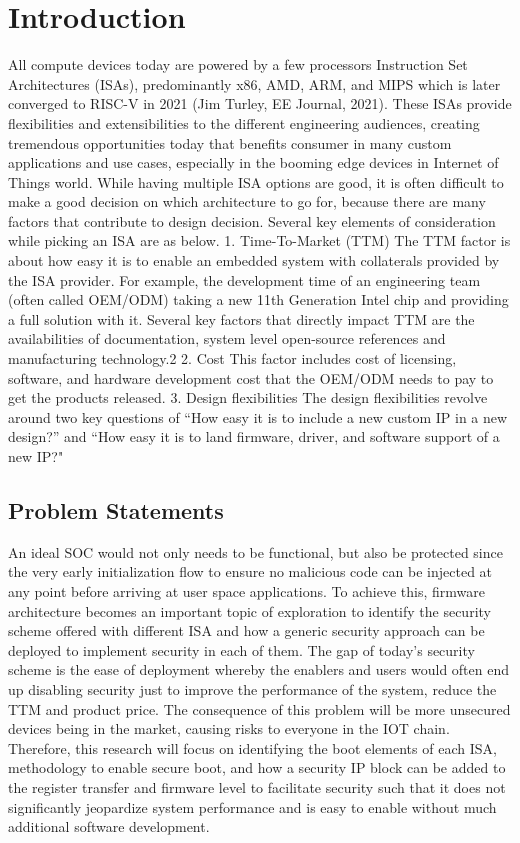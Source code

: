 \documentclass[a4paper,fleqn]{cas-dc}
\begin{document}
\section{Introduction}
All compute devices today are powered by a few processors Instruction Set Architectures
(ISAs), predominantly x86, AMD, ARM, and MIPS which is later converged to RISC-V in
2021 (Jim Turley, EE Journal, 2021). These ISAs provide flexibilities and extensibilities to the
different engineering audiences, creating tremendous opportunities today that benefits
consumer in many custom applications and use cases, especially in the booming edge devices
in Internet of Things world.
While having multiple ISA options are good, it is often difficult to make a good decision on
which architecture to go for, because there are many factors that contribute to design decision.
Several key elements of consideration while picking an ISA are as below.
1. Time-To-Market (TTM)
The TTM factor is about how easy it is to enable an embedded system with collaterals
provided by the ISA provider. For example, the development time of an engineering team
(often called OEM/ODM) taking a new 11th Generation Intel chip and providing a full
solution with it. Several key factors that directly impact TTM are the availabilities of
documentation, system level open-source references and manufacturing technology.2
2. Cost
This factor includes cost of licensing, software, and hardware development cost that the
OEM/ODM needs to pay to get the products released.
3. Design flexibilities
The design flexibilities revolve around two key questions of “How easy it is to include a
new custom IP in a new design?” and “How easy it is to land firmware, driver, and
software support of a new IP?"


\subsection{Problem Statements}
An ideal SOC would not only needs to be functional, but also be protected since the very early initialization flow to ensure no malicious code can be injected at any point before arriving at user space applications. To achieve this, firmware architecture becomes an important topic of exploration to identify the security scheme offered with different ISA and how a generic security approach can be deployed to implement security in each of them.
The gap of today’s security scheme is the ease of deployment whereby the enablers and users would often end up disabling security just to improve the performance of the system, reduce the TTM and product price. The consequence of this problem will be more unsecured devices being in the market, causing risks to everyone in the IOT chain. Therefore, this research will focus on identifying the boot elements of each ISA, methodology to enable secure boot, and how a security IP block can be added to the register transfer and firmware level to facilitate security such that it does not significantly jeopardize system performance and is easy to enable without much additional software development.
\end{document}
